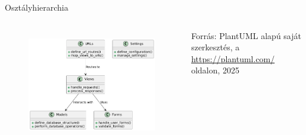 \documentclass[11pt]{beamer}
\begin{document}
\begin{frame}{Osztályhierarchia}
\begin{columns}[t]
         \begin{figure}[ht!]
            \centering
            \includegraphics[width=\textwidth]{class_hierarchy.png}
            \label{fig-class-hierarchy}
        \end{figure}
        \vspace{-1.5em}
        \scriptsize
        Forrás: PlantUML alapú saját szerkesztés, a \url{https://plantuml.com/} oldalon, 2025
    \end{columns}
\end{frame}
\end{document}
